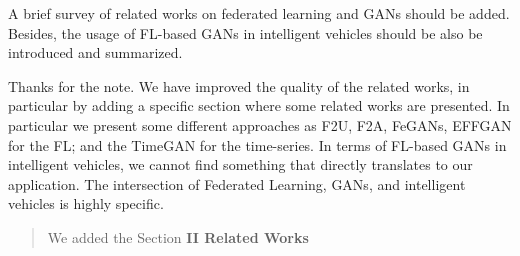 \documentclass{article}
\begin{document}
\RC A brief survey of related works on federated learning and GANs should be added. Besides, the usage of FL-based GANs in intelligent vehicles should be also be introduced and summarized.

\AR Thanks for the note. We have improved the quality of the related works, in particular by adding a specific section where some related works are presented.
In particular we present some different approaches as F2U, F2A, FeGANs, EFFGAN for the FL; and the TimeGAN for the time-series.
In terms of FL-based GANs in intelligent vehicles, we cannot find something that directly translates to our application. The intersection of Federated Learning, GANs, and intelligent vehicles is highly specific.


\begin{quote}
	We added the Section \textbf{II Related Works}
\end{quote}
\end{document}
